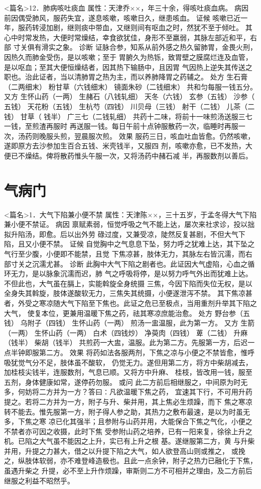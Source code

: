 \documentclass[a4paper,12pt,UTF8,twoside]{ctexbook}
\begin{document}
<篇名>12．肺病咳吐痰血
属性：天津乔××，年三十余，得咳吐痰血病。 
病因 前因偶受肺风，服药失宜，遂息咳嗽，咳嗽日久，继患咳血。 
证候 咳嗽已近一年，服药转浸加剧，继则痰中带血，又继则间有呕血之时，然犹不至于倾吐。 
其心中时常发热，大便时常燥结，幸食欲犹佳，身形不至羸弱，其脉左部近和平，右部 
寸关俱有滑实之象。 
诊断 证脉合参，知系从前外感之热久留肺胃，金畏火刑，因热久而肺金受伤，是以咳嗽；至于 
胃腑久为热铄，致胃壁之膜腐烂连及血管，是以呕血；至其大便恒燥结者，因其热下输肠中，且因胃 
气因热上逆失其传送之职也。治此证者，当以清肺胃之热为主，而以养肺降胃之药辅之。 
处方 生石膏（二两细末） 粉甘草（六钱细末） 镜面朱砂（二钱细末） 
共和匀每服一钱五分。 
又方 生怀山药（一两） 生赭石（八钱轧细） 天冬（六钱） 玄参（五钱） 沙参（ 
五钱） 天花粉（五钱） 生杭芍（四钱） 川贝母（三钱） 射干（二钱） 儿茶（二钱） 甘草（ 
钱半） 广三七（二钱轧细） 
共药十二味，将前十一味煎汤送服三七一钱，至煎渣再服时 
再送服一钱。每日午前十点钟服散药一次，临睡时再服一次，汤药则晚服头煎，翌晨服次煎。 
效果 服药三日，咳血吐血皆愈。仍然咳嗽，遂即原方去沙参加生百合五钱、米壳钱半，又服四 
剂，咳嗽亦愈，已不发热，大便已不燥结。俾将散药惟头午服一次，又将汤药中赭石减 
半，再服数剂以善后。 

\chapter{气病门}
<篇名>1．大气下陷兼小便不禁
属性：天津陈××，三十五岁，于孟冬得大气下陷兼小便不禁证。 
病因 禀赋素弱，恒觉呼吸之气不能上达，屡次来社求诊，投以拙拟升陷汤，即愈。后以出外劳 
碌过度，又兼受凉，陡然反复甚剧，不但大气下陷，且又小便不禁。 
证候 自觉胸中之气息息下坠，努力呼之犹难上达，其下坠之气行至少腹，小便即不能禁，且觉 
下焦凉甚，肢体无力，其脉左右皆沉濡，而右部寸关之沉濡尤甚。 
诊断 此胸中大气下陷之剧者也。此证因大气虚陷，心血之循环无力，是以脉象沉濡而迟，肺 
气之呼吸将停，是以努力呼气外出而犹难上达。不但此也，大气虽在膈上，实能斡旋全身统摄 
三焦，今因下陷而失位无权，是以全身失其斡旋，肢体遂酸软无力，三焦失其统摄，小便遂泄泻不禁。 
其下焦凉甚者，外受之寒凉随大气下陷至下焦也。此证之危已至极点，当用重剂升举其下陷之大气， 
使复本位，更兼用温暖下焦之药，祛其寒凉庶能治愈。 
处方 野台参（五钱） 乌附子（四钱） 生怀山药（一两） 
煎汤一盅温服，此为第一方。 
又方 生箭 （一两） 生怀山药（一两） 白术（四钱炒） 净萸肉（四钱） 
萆（二钱） 升麻（钱半） 柴胡（钱半） 
共煎药一大盅，温服。此为第二方。先服第一方，后迟一点半钟即服第二方。 
效果 将药如法各服两剂，下焦之凉与小便之不禁皆愈，惟呼吸犹觉气分不足，肢体虽不酸软， 
仍觉无力。遂但用第二方，将方中柴胡减去，加桂枝尖钱半，连服数剂，气息已顺。又将方中升麻、 
桂枝，皆改用一钱，服至五剂，身体健康如常，遂停药勿服。 
或问 此二方前后相继服之，中间原为时无多，何妨将二方并为一方？答曰∶凡欲温暖下焦之药， 
宜速其下行，不可用升药提之。若将二方并为一方，附子与升、柴并用，其上焦必生烦躁，而下 
焦之寒凉转不能去。惟先服第一方，附子得人参之助，其热力之敷布最速，是以为时虽无多，下焦之寒 
凉已化其强半；且参附与山药并用，大能保合下焦之气化，小便之不禁者亦可因之收摄，此时下焦 
受参附山药之培养，已有一阳来复，徐徐上升之机。已陷之大气虽不能因之上升，实已有上升之根 
基。遂继服第二方，黄 与升柴并用，升提之力甚大，借之以升提下陷之大气，如人欲登高山则或推之， 
或挽之，纵肢体软弱，亦不难登峰造极也。且此一点余钟，附子之热力已融化于下焦，虽遇升柴之 
升提，必不至上升作烦躁，审斯则二方不可相并之理由，及二方前后继服之利益不昭然乎。 
\end{document}
